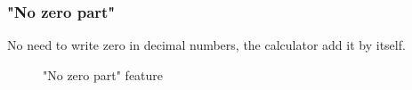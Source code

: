 \documentclass[a5paper, 10pt]{article}
\begin{document}
        \subsubsection{"No zero part"}
            No need to write zero in decimal numbers, the calculator add it by itself.
            \begin{figure}[h]
                \centering
                \caption{"No zero part" feature}
                \label{pic:"no_zero_part"}
            \end{figure}
\end{document}
